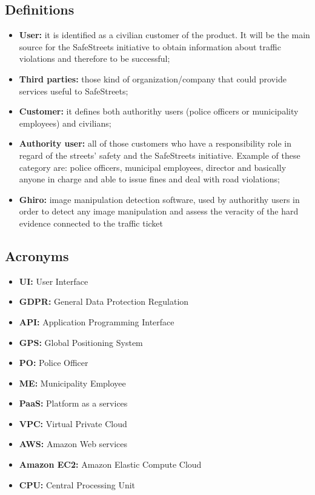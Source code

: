         \subsection{Definitions}
        \begin{itemize}            
            \item \textbf{User:} it is identified as a civilian customer of the
            product. It will be the main source for the SafeStreets initiative
            to obtain information about traffic violations and therefore to be
            successful;
            \item \textbf{Third parties:} those kind of organization/company that
            could provide services useful to SafeStreets; 
            \item \textbf{Customer:} it defines both authorithy users (police
            officers or municipality employees) and civilians; 
            \item \textbf{Authority user:} all of those customers who have a
            responsibility role in regard of the streets' safety and the
            SafeStreets initiative. Example of these category are: police
            officers, municipal employees, director and basically anyone in
            charge and able to issue fines and deal with road violations; 
            \item \textbf{Ghiro:} image manipulation detection software, used by
            authorithy users in order to detect any image manipulation and
            assess the veracity of the hard evidence connected to the traffic
            ticket\\
        \end{itemize}
        
        \newpage
        \subsection{Acronyms}
        \begin{itemize}
            \item \textbf{UI:} User Interface 
            \item \textbf{GDPR:} General Data Protection Regulation 
            \item \textbf{API:} Application Programming Interface
            \item \textbf{GPS:} Global Positioning System 
            \item \textbf{PO:} Police Officer 
            \item \textbf{ME:} Municipality Employee
            \item \textbf{PaaS:} Platform as a services
            \item \textbf{VPC:} Virtual Private Cloud
            \item \textbf{AWS:} Amazon\textsuperscript{\textcopyright} Web services
            \item \textbf{Amazon\textsuperscript{\textcopyright} EC2:} Amazon\textsuperscript{\textcopyright} Elastic Compute Cloud
            \item \textbf{CPU:} Central Processing Unit
        \end{itemize}
    
